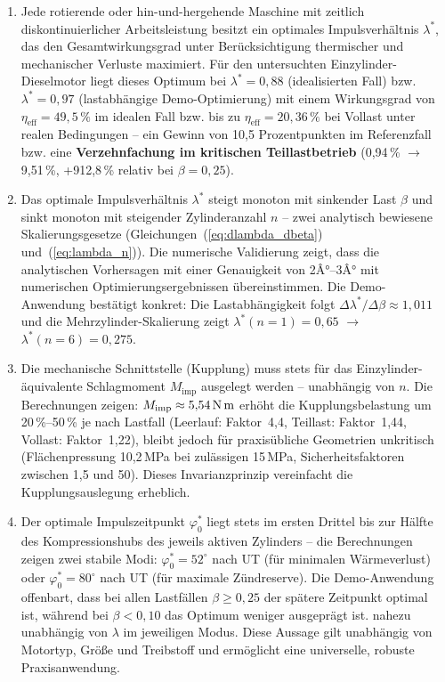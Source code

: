 ﻿\documentclass[a4paper,12pt]{article}
\begin{document}
\begin{enumerate}
	\item Jede rotierende oder hin-und-hergehende Maschine mit
	zeitlich diskontinuierlicher Arbeitsleistung besitzt ein
	optimales Impulsverhältnis $\lambda^*$, das den Gesamtwirkungsgrad
	unter Berücksichtigung thermischer und mechanischer Verluste maximiert.
	Für den untersuchten Einzylinder-Dieselmotor liegt dieses Optimum bei
	$\lambda^* = 0{,}88$ (idealisierten Fall) bzw. $\lambda^* = 0{,}97$
	(lastabhängige Demo-Optimierung) mit einem Wirkungsgrad von
	$\eta_\text{eff} = 49{,}5\,\%$ im idealen Fall bzw. bis zu
	$\eta_\text{eff} = 20{,}36\,\%$ bei Vollast unter realen Bedingungen
	-- ein Gewinn von 10{,}5 Prozentpunkten im Referenzfall bzw. eine
	\textbf{Verzehnfachung im kritischen Teillastbetrieb} (0{,}94\,\%
	$\rightarrow$ 9{,}51\,\%, +912{,}8\,\% relativ bei $\beta = 0{,}25$).

	\item Das optimale Impulsverhältnis $\lambda^*$ steigt monoton
	mit sinkender Last $\beta$ und sinkt monoton mit steigender
	Zylinderanzahl $n$ -- zwei analytisch bewiesene
	Skalierungsgesetze (Gleichungen~(\ref{eq:dlambda_dbeta})
	und~(\ref{eq:lambda_n})). Die numerische Validierung zeigt,
	dass die analytischen Vorhersagen mit einer Genauigkeit von
	2Â°--3Â° mit numerischen Optimierungsergebnissen übereinstimmen.
	Die Demo-Anwendung bestätigt konkret: Die Lastabhängigkeit folgt
	$\Delta\lambda^*/\Delta\beta \approx 1{,}011$ und die Mehrzylinder-Skalierung
	zeigt $\lambda^*(n=1) = 0{,}65$ $\rightarrow$ $\lambda^*(n=6) = 0{,}275$.

	\item Die mechanische Schnittstelle (Kupplung) muss stets für
	das Einzylinder-äquivalente Schlagmoment $M_\text{imp}$
	ausgelegt werden -- unabhängig von $n$. Die Berechnungen zeigen:
	$M_\text{imp} \approx 5{,}54\,\text{N\,m}$ erhöht die Kupplungsbelastung
	um 20\,\%--50\,\% je nach Lastfall (Leerlauf: Faktor~4{,}4, Teillast:
	Faktor~1{,}44, Vollast: Faktor~1{,}22), bleibt jedoch für praxisübliche
	Geometrien unkritisch (Flächenpressung 10{,}2\,MPa bei zulässigen 15\,MPa,
	Sicherheitsfaktoren zwischen 1{,}5 und 50). Dieses Invarianzprinzip
	vereinfacht die Kupplungsauslegung erheblich.

	\item Der optimale Impulszeitpunkt $\varphi_0^*$ liegt stets
	im ersten Drittel bis zur Hälfte des Kompressionshubs des jeweils aktiven
	Zylinders -- die Berechnungen zeigen zwei stabile Modi:
	$\varphi_0^* = 52^\circ$ nach UT (für minimalen Wärmeverlust) oder
	$\varphi_0^* = 80^\circ$ nach UT (für maximale Zündreserve).
	Die Demo-Anwendung offenbart, dass bei allen Lastfällen $\beta \geq 0{,}25$
	der spätere Zeitpunkt optimal ist, während bei $\beta < 0{,}10$ das Optimum
	weniger ausgeprägt ist.
	nahezu unabhängig von $\lambda$ im jeweiligen Modus. Diese Aussage gilt
	unabhängig von Motortyp, Größe und Treibstoff und ermöglicht eine
	universelle, robuste Praxisanwendung.


\end{enumerate}
\end{document}

